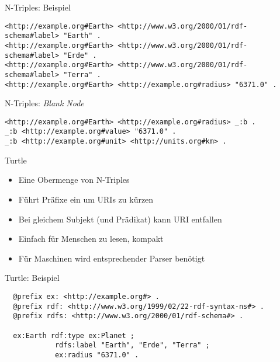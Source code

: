 \documentclass{beamer}
\begin{document}
\begin{frame}[fragile]{N-Triples: Beispiel}
	
	\scriptsize
	\begin{lstlisting}
<http://example.org#Earth> <http://www.w3.org/2000/01/rdf-schema#label> "Earth" .
<http://example.org#Earth> <http://www.w3.org/2000/01/rdf-schema#label> "Erde" .
<http://example.org#Earth> <http://www.w3.org/2000/01/rdf-schema#label> "Terra" .
<http://example.org#Earth> <http://example.org#radius> "6371.0" .
	\end{lstlisting}
	
\end{frame}

\begin{frame}[fragile]{N-Triples: \emph{Blank Node}}
	
	\small
	\begin{lstlisting}
<http://example.org#Earth> <http://example.org#radius> _:b .
_:b <http://example.org#value> "6371.0" .
_:b <http://example.org#unit> <http://units.org#km> .
	\end{lstlisting}
	
\end{frame}

\begin{frame}{Turtle}
	
	\begin{itemize}
		\item Eine Obermenge von N-Triples
		\item Führt Präfixe ein um URIs zu kürzen
		\item Bei gleichem Subjekt (und Prädikat) kann URI entfallen
		\item Einfach für Menschen zu lesen, kompakt
		\item Für Maschinen wird entsprechender Parser benötigt
	\end{itemize}
	
\end{frame}

\begin{frame}[fragile]{Turtle: Beispiel}
	
	\small
	\begin{lstlisting}
  @prefix ex: <http://example.org#> .
  @prefix rdf: <http://www.w3.org/1999/02/22-rdf-syntax-ns#> .
  @prefix rdfs: <http://www.w3.org/2000/01/rdf-schema#> .

  ex:Earth rdf:type ex:Planet ;
            rdfs:label "Earth", "Erde", "Terra" ;
            ex:radius "6371.0" .
	\end{lstlisting}
	
\end{frame}
\end{document}

